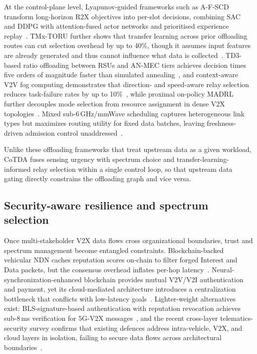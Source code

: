 \documentclass[final,3p,times,review,sort&compress]{elsarticle}
\begin{document}
At the control-plane level, Lyapunov-guided frameworks such as A-F-SCD transform long-horizon R2X objectives into per-slot decisions, combining SAC and DDPG with attention-fused actor networks and prioritised experience replay~\cite{KANG2026111852}.  TMx-TORU further shows that transfer learning across prior offloading routes can cut selection overhead by up to 40\%, though it assumes input features are already generated and thus cannot influence what data is collected~\cite{AKYILDIZ2026108292}.  TD3-based ratio offloading between RSUs and AN-MEC tiers achieves decision times five orders of magnitude faster than simulated annealing~\cite{YAHYA2025100862}, and context-aware V2V fog computing demonstrates that direction- and speed-aware relay selection reduces task-failure rates by up to 10\%~\cite{RAHMAN2020100236}, while proximal on-policy MADRL further decouples mode selection from resource assignment in dense V2X topologies~\cite{BUDHIRAJA2024268}.  Mixed sub-6\,GHz/mmWave scheduling captures heterogeneous link types but maximizes routing utility for fixed data batches, leaving freshness-driven admission control unaddressed~\cite{HE2023100610}.

Unlike these offloading frameworks that treat upstream data as a given workload, CoTDA fuses sensing urgency with spectrum choice and transfer-learning-informed relay selection within a single control loop, so that upstream data gating directly constrains the offloading graph and vice versa.

\subsection{Security-aware resilience and spectrum selection}
Once multi-stakeholder V2X data flows cross organizational boundaries, trust and spectrum management become entangled constraints.  Blockchain-backed vehicular NDN caches reputation scores on-chain to filter forged Interest and Data packets, but the consensus overhead inflates per-hop latency~\cite{KHELIFI2020106715}.  Neural-synchronization-enhanced blockchain provides mutual V2V/V2I authentication and payment, yet its cloud-mediated architecture introduces a centralization bottleneck that conflicts with low-latency goals~\cite{SARKAR2022100533}.  Lighter-weight alternatives exist: BLS-signature-based authentication with reputation revocation achieves sub-8\,ms verification for 5G-V2X messages~\cite{ABDELHAKEEM2023101638}, and the recent cross-layer telematics-security survey confirms that existing defences address intra-vehicle, V2X, and cloud layers in isolation, failing to secure data flows across architectural boundaries~\cite{WU2026101024}.
\end{document}
